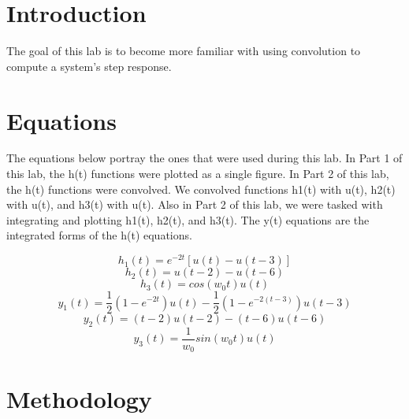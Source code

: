 \documentclass[12pt]{report}
\begin{document}
\section{Introduction}
 

The goal of this lab is to become more familiar with  using convolution to compute a system’s step response.

\section{Equations}

The equations below portray the ones that were used during this lab. In Part 1 of this lab, the h(t) functions were plotted as a single figure. In Part 2 of this lab, the h(t) functions were convolved. We convolved functions h1(t) with u(t), h2(t) with u(t), and h3(t) with u(t). Also in Part 2 of this lab, we were tasked with integrating and plotting h1(t), h2(t), and h3(t). The y(t) equations are the integrated forms of the h(t) equations.

\begin{equation}
    h_{1}(t) = e^{-2t}[u(t) - u(t-3)]
\end{equation}
\begin{equation}
    h_{2}(t) = u(t−2) − u(t−6)
\end{equation}
\begin{equation}
    h_{3}(t) = cos(w_{0}t)u(t)
\end{equation}
\begin{equation}
    y_{1}(t) = \frac{1}{2}(1-e^{-2t})u(t) - \frac{1}{2}(1-e^{-2(t-3)})u(t-3)
\end{equation}
\begin{equation}
    y_{2}(t) = (t-2)u(t-2) - (t-6)u(t-6)
\end{equation}
\begin{equation}
    y_{3}(t) = \frac{1}{w_{0}}sin(w_{0}t)u(t)
\end{equation}


\section{Methodology}
\end{document}
